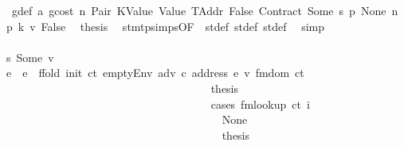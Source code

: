 \begin{isabellebody}
\ {}{\isacharparenleft}{\kern0pt}{}{\isacharparenright}{\kern0pt}\ g{\isacharunderscore}{\kern0pt}def\ a{}\ gcost\ n\ Pair\ KValue\ Value\ TAddr\ False\ Contract\ Some\ s{}\ p{}\ None\ n{}\ p{}\ k{}\ v\ False\ \isamarkupfalse%
\ {\isacharquery}{\kern0pt}thesis\ \isamarkupfalse%
\ stmt{\isachardot}{\kern0pt}psimps{\isacharparenleft}{\kern0pt}{}{\isacharparenright}{\kern0pt}{\isacharbrackleft}{\kern0pt}OF\ {}{\isacharparenleft}{\kern0pt}{}{\isacharparenright}{\kern0pt}{\isacharbrackright}{\kern0pt}\ st{\isacharprime}{\kern0pt}{\isacharunderscore}{\kern0pt}def\ st{\isacharprime}{\kern0pt}{\isacharprime}{\kern0pt}{\isacharunderscore}{\kern0pt}def\ st{\isacharprime}{\kern0pt}{\isacharprime}{\kern0pt}{\isacharprime}{\kern0pt}{\isacharunderscore}{\kern0pt}def\ \isamarkupfalse%
\ simp\isanewline
\ \ \ \ \ \ \ \ \ \ \ \ \ \ \ \ \ \ \ \ \ \ \ \ \ \ \ \ \ \ \ \ \ \ \isamarkupfalse%
\isanewline
\ \ \ \ \ \ \ \ \ \ \ \ \ \ \ \ \ \ \ \ \ \ \ \ \ \ \ \ \ \ \ \ \ \ \ \ \isamarkupfalse%
\ s{}{\isacharcolon}{\kern0pt}\ {\isacharparenleft}{\kern0pt}Some\ v{\isacharprime}{\kern0pt}{\isacharparenright}{\kern0pt}\isanewline
\ \ \ \ \ \ \ \ \ \ \ \ \ \ \ \ \ \ \ \ \ \ \ \ \ \ \ \ \ \ \ \ \ \ \ \ \isamarkupfalse%
\ e{\isacharprime}{\kern0pt}\ \ {\isachardoublequoteopen}e{\isacharprime}{\kern0pt}\ {\isacharequal}{\kern0pt}\ ffold\ {\isacharparenleft}{\kern0pt}init\ ct{\isacharparenright}{\kern0pt}\ {\isacharparenleft}{\kern0pt}emptyEnv\ adv\ c\ {\isacharparenleft}{\kern0pt}address\ e{\isacharparenright}{\kern0pt}\ v{\isacharprime}{\kern0pt}{\isacharparenright}{\kern0pt}\ {\isacharparenleft}{\kern0pt}fmdom\ ct{\isacharparenright}{\kern0pt}{\isachardoublequoteclose}\isanewline
\ \ \ \ \ \ \ \ \ \ \ \ \ \ \ \ \ \ \ \ \ \ \ \ \ \ \ \ \ \ \ \ \ \ \ \ \isamarkupfalse%
\ {\isacharquery}{\kern0pt}thesis\isanewline
\ \ \ \ \ \ \ \ \ \ \ \ \ \ \ \ \ \ \ \ \ \ \ \ \ \ \ \ \ \ \ \ \ \ \ \ \isamarkupfalse%
\ {\isacharparenleft}{\kern0pt}cases\ {\isachardoublequoteopen}fmlookup\ ct\ i{\isachardoublequoteclose}{\isacharparenright}{\kern0pt}\isanewline
\ \ \ \ \ \ \ \ \ \ \ \ \ \ \ \ \ \ \ \ \ \ \ \ \ \ \ \ \ \ \ \ \ \ \ \ \ \ \isamarkupfalse%
\ None\isanewline
\ \ \ \ \ \ \ \ \ \ \ \ \ \ \ \ \ \ \ \ \ \ \ \ \ \ \ \ \ \ \ \ \ \ \ \ \ \ \isamarkupfalse%
\ {\isacharquery}{\kern0pt}thesis\isanewline

\end{isabellebody}
